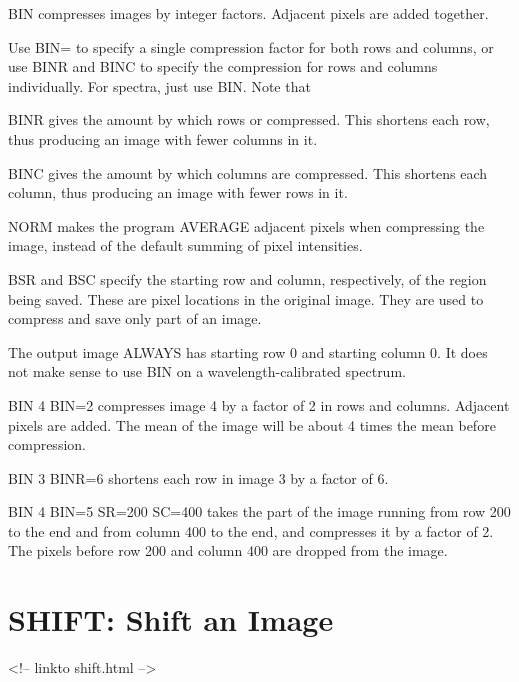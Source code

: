 BIN compresses images by integer factors.  Adjacent pixels are added
together.

Use BIN= to specify a single compression factor for both rows and columns,
or use BINR and BINC to specify the compression for rows and columns
individually.  For spectra, just use BIN.  Note that
\begin{example}
  \item[BINR\hfill]{gives the amount by which rows or compressed.  This
       shortens each row, thus producing an image with
       fewer columns in it.}
  \item[BINC\hfill]{gives the amount by which columns are compressed.
       This shortens each column, thus producing an image
       with fewer rows in it.}
\end{example}

NORM makes the program AVERAGE adjacent pixels when compressing the image,
instead of the default summing of pixel intensities.

BSR and BSC specify the starting row and column, respectively, of the
region being saved.  These are pixel locations in the original image.  They
are used to compress and save only part of an image.

The output image ALWAYS has starting row 0 and starting column 0.  It does
not make sense to use BIN on a wavelength-calibrated spectrum.

\begin{example}
  \item[BIN 4 BIN=2\hfill]{compresses image 4 by a factor of 2
       in rows and columns.  Adjacent pixels
       are added.  The mean of the image will
       be about 4 times the mean before
       compression.}
  \item[BIN 3 BINR=6\hfill]{shortens each row in image 3 by a 
       factor of 6.}
  \item[BIN 4 BIN=5 SR=200 SC=400\hfill]{
       takes the part of the image running 
       from row 200 to the end and from
       column 400 to the end, and compresses
       it by a factor of 2.  The pixels 
       before row 200 and column 400 are
       dropped from the image.}
\end{example}

\section{SHIFT: Shift an Image}
\begin{rawhtml}
<!-- linkto shift.html -->
\end{rawhtml}

